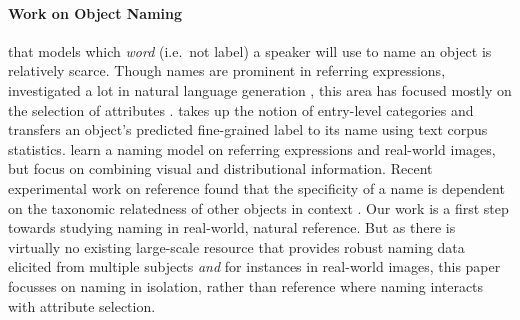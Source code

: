 \paragraph{Work on Object Naming} that models which \textit{word} (i.e.\ not label) a speaker will use to name an object is relatively scarce.
Though names are prominent in referring expressions, investigated a lot in natural language generation \cite{dale:1995}, this area has focused mostly on the selection of attributes %
\cite{krahmer:2012}. 
 takes up the notion of entry-level categories \cite{rosch1976basic} and transfers an object's predicted fine-grained label to its name using text corpus statistics.
  learn a naming model on referring expressions and real-world images, but focus on combining visual and distributional information. 
 Recent experimental work on reference found that the specificity of a name is dependent on the taxonomic relatedness of other objects in context
\cite{rohde2012communicating,graf2016animal}. Our work is a first step towards studying naming in real-world, natural reference.
But as there is virtually no existing large-scale resource that provides robust naming data elicited from multiple subjects \textit{and} for instances in real-world images, this paper focusses on naming in isolation, rather than reference where naming interacts with attribute selection.





